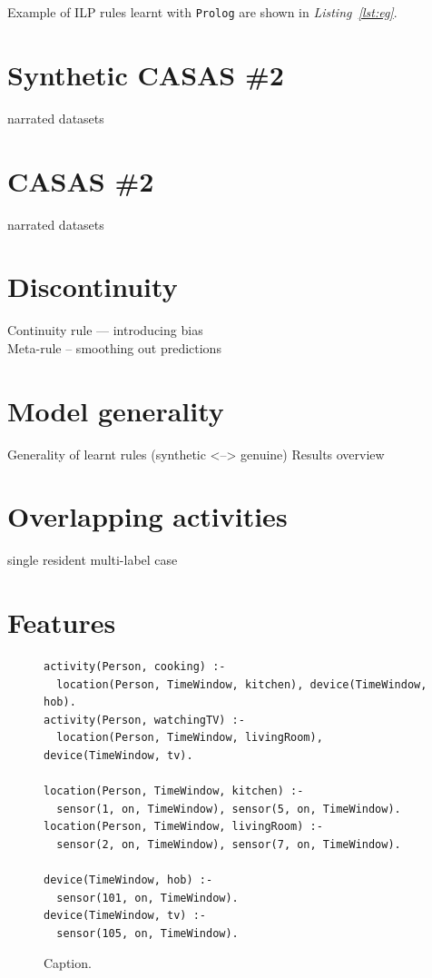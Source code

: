 \documentclass[12pt, a4paper, pdflatex, leqno, twoside, openright]{report}
\begin{document}
Example of ILP rules learnt with \texttt{Prolog} are shown in \emph{Listing~\ref{lst:eg}}.

  \section{Synthetic CASAS \#2}
narrated datasets
  \section{CASAS \#2}
narrated datasets
  \section{Discontinuity}
Continuity rule --- introducing bias\\
Meta-rule -- smoothing out predictions
  \section{Model generality}
Generality of learnt rules (synthetic <--> genuine) Results overview
  \section{Overlapping activities}
single resident multi-label case

  \section{Features}


\begin{figure}[htb] %
  \begin{verbatim}
activity(Person, cooking) :-
  location(Person, TimeWindow, kitchen), device(TimeWindow, hob).
activity(Person, watchingTV) :-
  location(Person, TimeWindow, livingRoom), device(TimeWindow, tv).

location(Person, TimeWindow, kitchen) :-
  sensor(1, on, TimeWindow), sensor(5, on, TimeWindow).
location(Person, TimeWindow, livingRoom) :-
  sensor(2, on, TimeWindow), sensor(7, on, TimeWindow).

device(TimeWindow, hob) :-
  sensor(101, on, TimeWindow).
device(TimeWindow, tv) :-
  sensor(105, on, TimeWindow).
  \end{verbatim}
  \caption{Caption.\label{lst:label}}
\end{figure}
\end{document}

